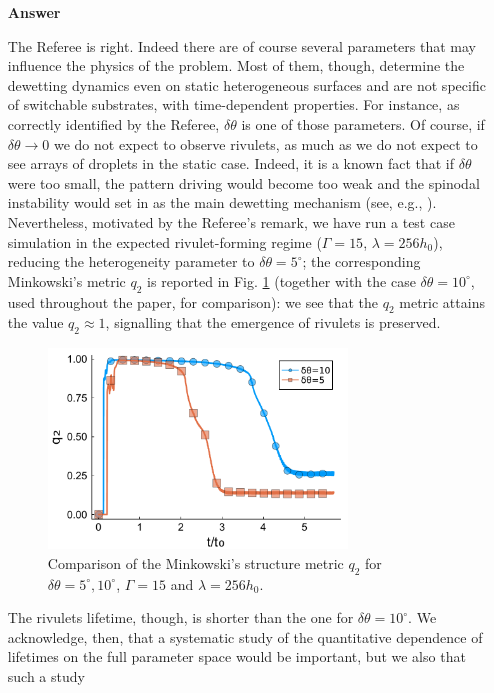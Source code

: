 \documentclass[12pt,english]{article}
\begin{document}
\begin{itemize}
\item[ \textbf{{Answer}}]
{ 
The Referee is right. Indeed there are of course several parameters 
that may influence the physics of the problem. 
Most of them, though, determine the dewetting dynamics even on static heterogeneous surfaces and are not specific of switchable substrates, with time-dependent properties.
For instance, as correctly identified by the Referee, $\delta \theta$ is one of those 
parameters. Of course, if $\delta \theta \rightarrow 0$ we do not expect to observe rivulets, as much as we do not expect to see arrays of droplets in the static case. Indeed, it is a known fact that if $\delta \theta$ were too small, the pattern driving would become too weak and the spinodal instability would set in as the main dewetting mechanism (see, e.g., \cite{KonnurPRL2000}). 
Nevertheless, motivated by the Referee's remark, we have run a test case simulation in 
the expected rivulet-forming regime ($\Gamma=15$, $\lambda = 256 h_0$), reducing 
the heterogeneity parameter to $\delta \theta = 5^{\circ}$; 
the corresponding Minkowski's metric $q_2$ is reported 
in Fig. \ref{fig:dif_contrast} (together with the case $\delta \theta =10^{\circ}$, used throughout the 
paper, for comparison): we see that the $q_2$ metric attains the value $q_2 \approx 1$, signalling 
that the emergence of rivulets is preserved.
\begin{figure}
    \centering
    \includegraphics[width=0.75\textwidth]{SupMatFig_2.pdf}
    \caption{Comparison of the Minkowski's structure metric $q_2$ for 
    $\delta\theta = 5^{\circ}, 10^{\circ}$, 
    $\Gamma = 15$ and $\lambda = 256 h_0$.}
    \label{fig:dif_contrast}
\end{figure}
The rivulets lifetime, though, is shorter than the one for $\delta \theta = 10^{\circ}$.
We acknowledge, then, that a systematic study of the quantitative dependence of 
lifetimes on the full parameter space would be important, but we also that such a study
}
\end{itemize}
\end{document}
